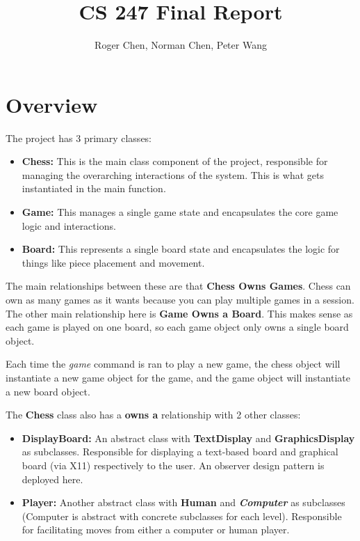 \documentclass[12pt]{article}
\title{CS 247 Final Report}
\author{Roger Chen, Norman Chen, Peter Wang}
\date{}
\begin{document}
\maketitle


\section*{Overview}

The project has 3 primary classes:
\begin{itemize}
	\item\textbf{Chess:} This is the main class 
	component of the project, responsible for 
	managing the overarching interactions of 
	the system. This is what gets instantiated 
	in the main function.
	\item\textbf{Game:} This manages a single 
	game state and encapsulates the core game
	logic and interactions.
	\item\textbf{Board:} This represents
	a single board state and encapsulates
	the logic for things like piece placement
	and movement.
\end{itemize}

The main relationships between these are that
\textbf{Chess Owns Games}. Chess can own as
many games as it wants because you can
play multiple games in a session. The
other main relationship here is \textbf{Game Owns
a Board}. This makes sense as each game is played on
one board, so each game object only owns a 
single board object. 

\bigskip

Each time the \textit{game} command is ran to play a new game,
the chess object will instantiate a new game object
for the game, and the game object will instantiate 
a new board object.

\bigskip

The \textbf{Chess} class also has a \textbf{owns a}
relationship with 2 other classes:
\begin{itemize}
	\item\textbf{DisplayBoard:} An abstract class with 
	\textbf{TextDisplay} and \textbf{GraphicsDisplay} as subclasses. 
	Responsible for displaying a text-based board and graphical board 
	(via X11) respectively to the user.
	An observer design pattern is deployed here.

	\item\textbf{Player:} Another abstract class with
	\textbf{Human} and \textit{\textbf{Computer}} as subclasses (Computer is abstract
	with concrete subclasses for each level). Responsible
	for facilitating moves from either a computer or
	human player.
\end{itemize}
\end{document}
